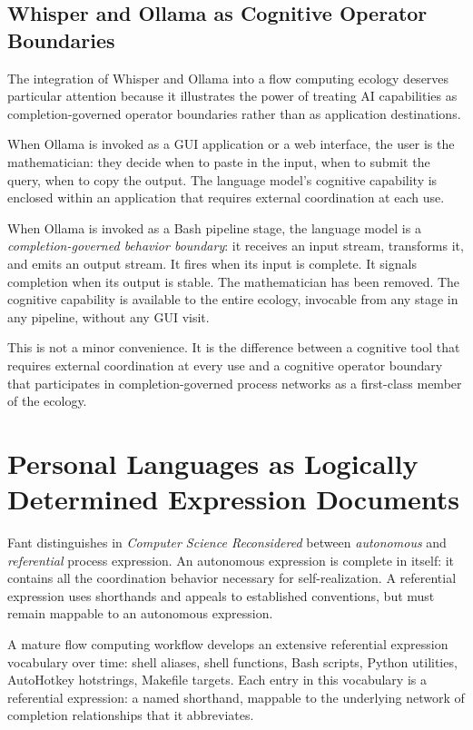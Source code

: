 \documentclass[12pt, a4paper]{article}
\begin{document}
\subsection{Whisper and Ollama as Cognitive Operator Boundaries}

The integration of Whisper and Ollama into a flow computing ecology
deserves particular attention because it illustrates the power of
treating AI capabilities as completion-governed operator boundaries
rather than as application destinations.

When Ollama is invoked as a GUI application or a web interface,
the user is the mathematician: they decide when to paste in the
input, when to submit the query, when to copy the output. The
language model's cognitive capability is enclosed within an
application that requires external coordination at each use.

When Ollama is invoked as a Bash pipeline stage, the language
model is a \emph{completion-governed behavior boundary}: it receives
an input stream, transforms it, and emits an output stream. It fires
when its input is complete. It signals completion when its output is
stable. The mathematician has been removed. The cognitive capability
is available to the entire ecology, invocable from any stage in any
pipeline, without any GUI visit.

This is not a minor convenience. It is the difference between a
cognitive tool that requires external coordination at every use and
a cognitive operator boundary that participates in completion-governed
process networks as a first-class member of the ecology.

\section{Personal Languages as Logically Determined Expression Documents}

Fant distinguishes in \textit{Computer Science Reconsidered} between
\emph{autonomous} and \emph{referential} process expression. An
autonomous expression is complete in itself: it contains all the
coordination behavior necessary for self-realization. A referential
expression uses shorthands and appeals to established conventions,
but must remain mappable to an autonomous expression.

A mature flow computing workflow develops an extensive referential
expression vocabulary over time: shell aliases, shell functions,
Bash scripts, Python utilities, AutoHotkey hotstrings, Makefile
targets. Each entry in this vocabulary is a referential expression:
a named shorthand, mappable to the underlying network of completion
relationships that it abbreviates.
\end{document}
